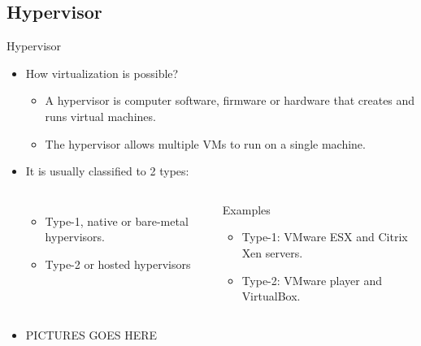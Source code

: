 \subsection{Hypervisor}\label{subsec:hypervisor}
\begin{frame}{Hypervisor}
    \begin{itemize}[<+- | alert@+>]
        \item How virtualization is possible?
        \begin{itemize}[<+- | alert@+>]
            \item A hypervisor is computer software, firmware or hardware that creates and runs virtual machines.
            \item The hypervisor allows multiple VMs to run on a single machine.
        \end{itemize}
        \item It is usually classified to 2 types:
        \begin{columns}[T,onlytextwidth]
            \begin{itemize}
                \item Type-1, native or bare-metal hypervisors.
                \item Type-2 or hosted hypervisors
            \end{itemize}
            \begin{block}{Examples}
                \begin{itemize}
                    \item Type-1: VMware ESX and Citrix Xen servers.
                    \item Type-2: VMware player and VirtualBox.
                \end{itemize}
            \end{block}
        \end{columns}
        \item PICTURES GOES HERE
    \end{itemize}
\end{frame}
